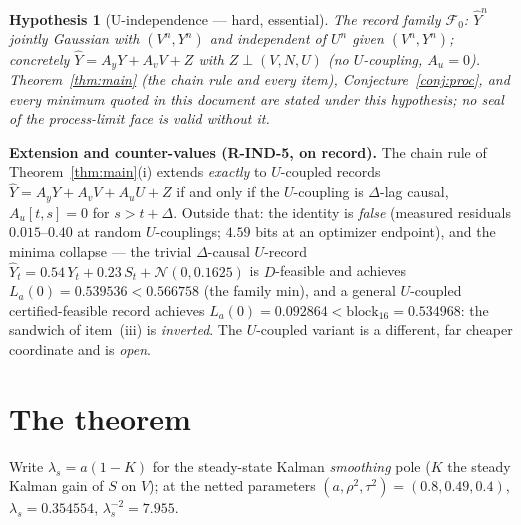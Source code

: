 \documentclass[11pt]{article}
\newtheorem{hypothesis}{Hypothesis}
\theoremstyle{definition}
\theoremstyle{remark}
\begin{document}
\begin{hypothesis}[U-independence --- hard, essential]
\label{hyp:uind}
The record family $\mathcal F_0$: $\hat Y^n$ jointly Gaussian with
$(V^n,Y^n)$ and \emph{independent of $U^n$ given $(V^n,Y^n)$};
concretely $\hat Y=A_yY+A_vV+Z$ with $Z\perp(V,N,U)$ (no
$U$-coupling, $A_u=0$). Theorem~\ref{thm:main} (the chain rule and
every item), Conjecture~\ref{conj:proc}, and \emph{every minimum
quoted in this document} are stated under this hypothesis; no seal
of the process-limit face is valid without it.
\end{hypothesis}

\noindent\textbf{Extension and counter-values (R-IND-5, on record).}
The chain rule of Theorem~\ref{thm:main}(i) extends \emph{exactly}
to $U$-coupled records $\hat Y=A_yY+A_vV+A_uU+Z$ if and only if the
$U$-coupling is $\Delta$-lag causal, $A_u[t,s]=0$ for $s>t+\Delta$.
Outside that: the identity is \emph{false} (measured residuals
$0.015$--$0.40$ at random $U$-couplings; $4.59$ bits at an optimizer
endpoint), and the minima collapse --- the trivial $\Delta$-causal
$U$-record $\hat Y_t=0.54\,Y_t+0.23\,S_t+\mathcal N(0,0.1625)$ is
$D$-feasible and achieves $L_a(0)=0.539536<0.566758$ (the family
min), and a general $U$-coupled certified-feasible record achieves
$L_a(0)=0.092864<\mathrm{block}_{16}=0.534968$: the sandwich of
item~(iii) is \emph{inverted}. The $U$-coupled variant is a
different, far cheaper coordinate and is \emph{open}.

\section{The theorem}
Write $\lambda_s=a(1-K)$ for the steady-state Kalman
\emph{smoothing} pole ($K$ the steady Kalman gain \cite{bib:kalman60}
of $S$ on $V$);
at the netted parameters $(a,\rho^2,\tau^2)=(0.8,0.49,0.4)$,
$\lambda_s=0.354554$, $\lambda_s^{-2}=7.955$.
\end{document}
